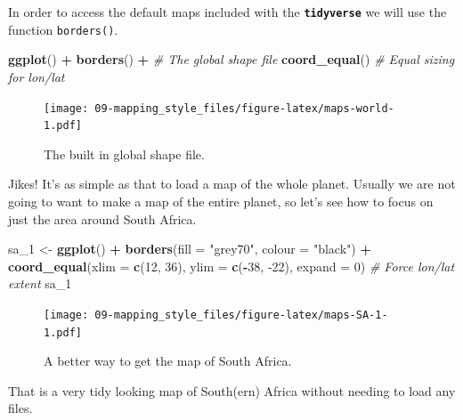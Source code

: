 \documentclass[
]{book}
\newenvironment{Shaded}{\begin{snugshade}}{\end{snugshade}}
\newcommand{\CommentTok}[1]{\textcolor[rgb]{0.56,0.35,0.01}{\textit{#1}}}
\newcommand{\DataTypeTok}[1]{\textcolor[rgb]{0.13,0.29,0.53}{#1}}
\newcommand{\DecValTok}[1]{\textcolor[rgb]{0.00,0.00,0.81}{#1}}
\newcommand{\KeywordTok}[1]{\textcolor[rgb]{0.13,0.29,0.53}{\textbf{#1}}}
\newcommand{\NormalTok}[1]{#1}
\newcommand{\OperatorTok}[1]{\textcolor[rgb]{0.81,0.36,0.00}{\textbf{#1}}}
\newcommand{\StringTok}[1]{\textcolor[rgb]{0.31,0.60,0.02}{#1}}
\begin{document}
In order to access the default maps included with the \textbf{\texttt{tidyverse}} we will use the function \texttt{borders()}.

\begin{Shaded}
\begin{Highlighting}[]
\KeywordTok{ggplot}\NormalTok{() }\OperatorTok{+}
\StringTok{  }\KeywordTok{borders}\NormalTok{() }\OperatorTok{+}\StringTok{ }\CommentTok{\# The global shape file}
\StringTok{  }\KeywordTok{coord\_equal}\NormalTok{() }\CommentTok{\# Equal sizing for lon/lat }
\end{Highlighting}
\end{Shaded}

\begin{figure}
\centering
\texttt{[image: 09-mapping\_style\_files/figure-latex/maps-world-1.pdf]}
\caption{\label{fig:maps-world}The built in global shape file.}
\end{figure}

Jikes! It's as simple as that to load a map of the whole planet. Usually we are not going to want to make a map of the entire planet, so let's see how to focus on just the area around South Africa.

\begin{Shaded}
\begin{Highlighting}[]
\NormalTok{sa\_}\DecValTok{1}\NormalTok{ <{-}}\StringTok{ }\KeywordTok{ggplot}\NormalTok{() }\OperatorTok{+}
\StringTok{  }\KeywordTok{borders}\NormalTok{(}\DataTypeTok{fill =} \StringTok{"grey70"}\NormalTok{, }\DataTypeTok{colour =} \StringTok{"black"}\NormalTok{) }\OperatorTok{+}
\StringTok{  }\KeywordTok{coord\_equal}\NormalTok{(}\DataTypeTok{xlim =} \KeywordTok{c}\NormalTok{(}\DecValTok{12}\NormalTok{, }\DecValTok{36}\NormalTok{), }\DataTypeTok{ylim =} \KeywordTok{c}\NormalTok{(}\OperatorTok{{-}}\DecValTok{38}\NormalTok{, }\DecValTok{{-}22}\NormalTok{), }\DataTypeTok{expand =} \DecValTok{0}\NormalTok{) }\CommentTok{\# Force lon/lat extent}
\NormalTok{sa\_}\DecValTok{1}
\end{Highlighting}
\end{Shaded}

\begin{figure}
\centering
\texttt{[image: 09-mapping\_style\_files/figure-latex/maps-SA-1-1.pdf]}
\caption{\label{fig:maps-SA-1}A better way to get the map of South Africa.}
\end{figure}

That is a very tidy looking map of South(ern) Africa without needing to load any files.
\end{document}
